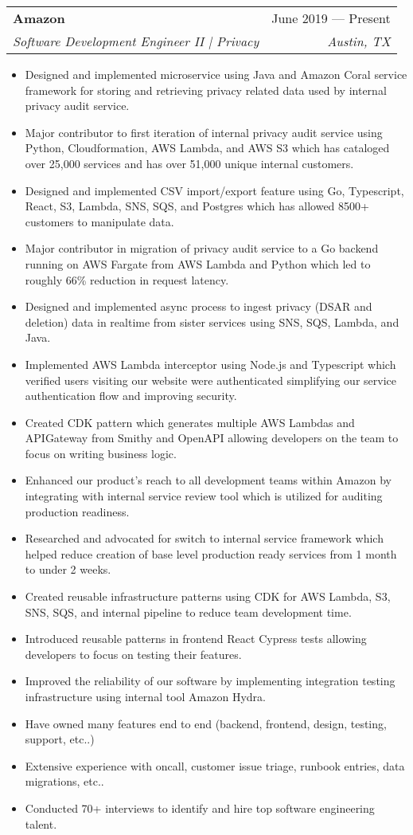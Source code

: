 \documentclass[letterpaper,11pt]{article}
\makeatletter
\newcommand{\resumeItem}[1]{
  \item\small{
    {#1 \vspace{-2pt}}
  }
}
\newcommand{\resumeSubheading}[4]{
  \vspace{-2pt}\item
    \begin{tabular*}{0.97\textwidth}[t]{l@{\extracolsep{\fill}}r}
      \textbf{#1} & #2 \\
      \textit{\small#3} & \textit{\small #4} \\
    \end{tabular*}\vspace{-7pt}
}
\newcommand{\resumeItemListStart}{\begin{itemize}}
\newcommand{\resumeItemListEnd}{\end{itemize}\vspace{-5pt}}
\makeatother
\begin{document}
    \resumeSubheading{Amazon}{June 2019 --- Present}{Software Development Engineer II | Privacy}{Austin, TX}
      \resumeItemListStart{}
        \resumeItem{Designed and implemented microservice using Java and Amazon Coral service framework for storing and retrieving privacy related data used by internal privacy audit service.}
        \resumeItem{Major contributor to first iteration of internal privacy audit service using Python, Cloudformation, AWS Lambda, and AWS S3 which has cataloged over 25,000 services and has over 51,000 unique internal customers.}  
        \resumeItem{Designed and implemented CSV import/export feature using Go, Typescript, React, S3, Lambda, SNS, SQS, and Postgres which has allowed 8500+ customers to manipulate data.}
        \resumeItem{Major contributor in migration of privacy audit service to a Go backend running on AWS Fargate from AWS Lambda and Python which led to roughly 66\% reduction in request latency.}
        \resumeItem{Designed and implemented async process to ingest privacy (DSAR and deletion) data in realtime from sister services using SNS, SQS, Lambda, and Java.}
        \resumeItem{Implemented AWS Lambda interceptor using Node.js and Typescript which verified users visiting our website were authenticated simplifying our service authentication flow and improving security.}
        \resumeItem{Created CDK pattern which generates multiple AWS Lambdas and APIGateway from Smithy and OpenAPI allowing developers on the team to focus on writing business logic.}
        \resumeItem{Enhanced our product’s reach to all development teams within Amazon by integrating with internal service review tool which is utilized for auditing production readiness.}
        \resumeItem{Researched and advocated for switch to internal service framework which helped reduce creation of base level production ready services from 1 month to under 2 weeks.}
        \resumeItem{Created reusable infrastructure patterns using CDK for AWS Lambda, S3, SNS, SQS, and internal pipeline to reduce team development time.}
        \resumeItem{Introduced reusable patterns in frontend React Cypress tests allowing developers to focus on testing their features.}
        \resumeItem{Improved the reliability of our software by implementing integration testing infrastructure using internal tool Amazon Hydra.}
        \resumeItem{Have owned many features end to end (backend, frontend, design, testing, support, etc..)}
        \resumeItem{Extensive experience with oncall, customer issue triage, runbook entries, data migrations, etc..}
        \resumeItem{Conducted 70+ interviews to identify and hire top software engineering talent.}
      \resumeItemListEnd{}
      
\end{document}
